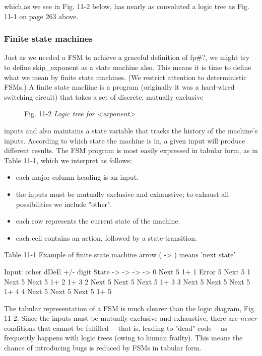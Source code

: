 which,as we see in Fig. 11-2 below, has nearly as convoluted a logic tree as Fig. 11-1 on page 263 above.

\subsubsection{Finite state machines}

Just as we needed a FSM to achieve a graceful definition of fp\#?, we might try to define skip\_exponent as a state machine also. This means it is time to define what we mean by finite state machines. (We restrict attention to deterministic FSMs.) A finite state macliine is a program (originally it was a hard-wired switching circuit) that takes a set of discrete, mutually exclusive

\begin{figure}
    \caption{ Fig. 11-2 \textit{Logic tree for <exponent>}}
\end{figure}

inputs and also maintains a state variable that tracks the history of the machine's inputs. According to which state the machine is in, a given input will produce different results. The FSM program is most easily expressed in tabular form, as in Table 11-1, which we interpret as follows:

\begin{itemize}
    \item each major column heading is an input.
    \item the inputs must be mutually exclusive and exhaustive; to exhaust all possibilities we include "other".
    \item each row represents the current state of the machine.
    \item each cell contains an action, followed by a state-transition.
\end{itemize}

Table 11-1 Example of finite state machine arrow ( -> ) means 'next state'

Input:  other       dDeE        +/-         digit
State         ->          ->          ->          ->
0       Next  5     1+    1     Error 5     Next  5
1       Next  5     Next  5     1+ 2  1+    3
2       Next  5     Next  5     Next  5     1+    3
3       Next  5     Next  5     Next  5     1+    4
4       Next  5     Next  5     Next  5     1+    5

The tabular representation of a FSM is much clearer than the logic diagram, Fig. 11-2. Since the inputs must be mutually exclusive and exhaustive, there are \textit{never} conditions that cannot be fulfilled —that is, leading to "dead" code— as frequently happens with logic trees (owing to human frailty). This means the chance of introducing bugs is reduced by FSMs in tabular form.

